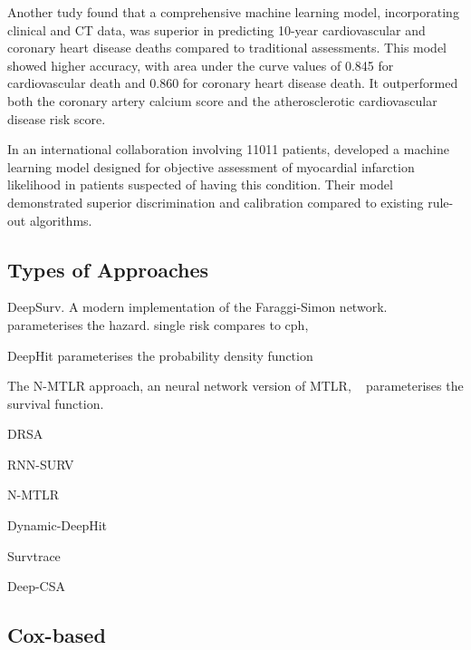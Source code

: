 \vspace{10em}





Another tudy found that a comprehensive machine learning model, incorporating
clinical and CT data, was superior in predicting 10-year cardiovascular and
coronary heart disease deaths compared to traditional assessments. This model
showed higher accuracy, with area under the curve values of 0.845 for
cardiovascular death and 0.860 for coronary heart disease death. It
outperformed both the coronary artery calcium score and the atherosclerotic
cardiovascular disease risk score.
~\autocite{nakanishiMachine2021}




In an international collaboration involving \num{11011} patients, \citeauthor{thanMachine2019} developed a machine learning model 
designed for objective assessment of myocardial infarction likelihood 
in patients suspected of having this condition. 
Their model demonstrated superior discrimination and calibration 
compared to existing rule-out algorithms.
~\autocite{thanMachine2019}






\subsection{Types of Approaches}

DeepSurv.
A modern implementation of the Faraggi-Simon network.
parameterises the hazard.
single risk
compares to cph,
~\autocite{katzmanDeepSurv2018a}


DeepHit
parameterises the probability density function
~\autocite{leeDeepHit2018}



The N-MTLR approach, 
an neural network version of MTLR,
~\autocite{yuLearning2011}
parameterises the survival function.
~\autocite{fotsoDeep2018}



DRSA

RNN-SURV

N-MTLR

Dynamic-DeepHit

Survtrace

Deep-CSA







\subsection{Cox-based}

